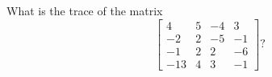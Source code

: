 \begin{activity}
What is the trace of the matrix
\begin{equation*}
\begin{bmatrix} 4&5&-4&3
\\-2&2&-5&-1
\\-1&2&2&-6
\\-13&4&3&-1 \end{bmatrix}?
\end{equation*}
\end{activity}



